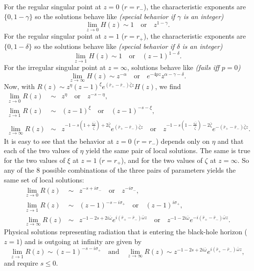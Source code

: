 \documentclass[11pt]{article}
\begin{document}
For the regular singular point at $z=0$ ($r=r_\minus$), the
characteristic exponents are $\{0,1-\gamma\}$ so the solutions behave
like
{\em (special behavior if $\gamma$ is an integer)}
\begin{equation}
  \lim_{z\to0}H(z)\sim1 \quad\mbox{or}\quad z^{1-\gamma}.
\end{equation}
For the regular singular point at $z=1$ ($r=r_+$), the characteristic
exponents are $\{0,1-\delta\}$ so the solutions behave like
{\em (special behavior if $\delta$ is an integer)}
\begin{equation}
  \lim_{z\to1}H(z)\sim1 \quad\mbox{or}\quad (z-1)^{1-\delta}.
\end{equation}
For the irregular singular point at $z=\infty$, solutions behave like
{\em (fails iff $p=0$)}
\begin{equation}
  \lim_{z\to\infty}H(z)\sim z^{-\alpha} \quad\mbox{or}\quad 
  e^{-4pz}z^{\alpha-\gamma-\delta}.
\end{equation}
Now, with $R(z)\sim z^\eta(z-1)^\xi e^{(\bar{r}_+-\bar{r}_\minus)\bar\zeta z}H(z)$, we
find
\begin{eqnarray}
  \lim_{z\to0}R(z)&\sim& z^\eta \quad\mbox{or}\quad z^{-s-\eta}, \\
  \lim_{z\to1}R(z)&\sim& (z-1)^\xi \quad\mbox{or}\quad (z-1)^{-s-\xi},\\
  \lim_{z\to\infty}R(z)&\sim& 
z^{-1-s(1+\frac{i\bar\omega}{\bar\zeta})+2\bar\zeta}e^{(\bar{r}_+-\bar{r}_\minus)\bar\zeta z} 
\quad\mbox{or}\quad 
z^{-1-s(1-\frac{i\bar\omega}{\bar\zeta})-2\bar\zeta}e^{-(\bar{r}_+-\bar{r}_\minus)\bar\zeta z}.
\end{eqnarray}
It is easy to see that the behavior at $z=0$ ($r=r_\minus$) depends
only on $\eta$ and that each of the two values of $\eta$ yield the
same pair of local solutions.  The same is true for the two values of
$\xi$ at $z=1$ ($r=r_+$), and for the two values of $\zeta$ at
$z=\infty$.  So any of the 8 possible combinations of the three pairs
of parameters yields the same set of local solutions:
\begin{eqnarray}
  \lim_{z\to0}R(z)&\sim& z^{-s+i\sigma_\minus} \quad\mbox{or}\quad z^{-i\sigma_\minus}, \\
  \lim_{z\to1}R(z)&\sim& (z-1)^{-s-i\sigma_+} \quad\mbox{or}\quad (z-1)^{i\sigma_+},\\
  \lim_{z\to\infty}R(z)&\sim& 
z^{-1-2s+2i\bar\omega}e^{i(\bar{r}_+-\bar{r}_\minus)\bar\omega z} 
\quad\mbox{or}\quad 
z^{-1-2i\bar\omega}e^{-i(\bar{r}_+-\bar{r}_\minus)\bar\omega z}.
\end{eqnarray}
Physical solutions representing radiation that is entering the black-hole
horizon ($z=1$) and is outgoing at infinity are given by
\begin{equation}\label{eq:Phys_R_BCs}
  \lim_{z\to1}R(z)\sim (z-1)^{-s-i\sigma_+} \quad\mbox{and}\quad
  \lim_{z\to\infty}R(z)\sim 
  z^{-1-2s+2i\bar\omega}e^{i(\bar{r}_+-\bar{r}_\minus)\bar\omega z},
\end{equation}
and require $s\le0$.
\end{document}
